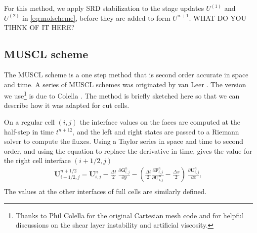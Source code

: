For this method, we apply SRD stabilization to the stage updates
$U^{(1)}$ and $U^{(2)}$ in \eqref{eq:molscheme}, before they are added to form $U^{n+1}$.
WHAT DO YOU TIHNK OF IT HERE?

\subsection{MUSCL scheme} \label{sec:muscl}
The MUSCL scheme is a one step method that is second order accurate in
space and time. A series of MUSCL schemes  was originated by van Leer 
\cite{vanleer:muscl}. The version we use\footnote{Thanks to Phil 
Colella for the original Cartesian mesh code and for helpful discussions on the shear
layer instability and artificial viscosity.}
is due to Colella \cite{Colella:Unsplit}.
The method is briefly sketched here so that we can describe how it was
adapted for cut cells. 

On a regular cell $(i,j)$ the interface values on the 
faces are computed at the half-step in time $t^{n+12}$, and the left and right states
are passed to a Riemann
solver to compute the fluxes.
Using a Taylor series in space and time to second order,
and using the equation to replace the derivative in time, gives the value for the right cell
interface $(i+1/2,j)$ 
\begin{equation}\label{eqn:taylor}
\begin{split}
\mathbf{U}_{i+1/2,j}^{n+1/2}   = \mathbf{U}_{i,j}^n - \frac{\Delta t}{2} \, 
             \frac{\partial \mathbf{G}_{i,j}^n}{\partial y}  -
            \left( \frac{\Delta t}{2} 
            \frac{\partial \mathbf{F}_{i,j}^n}{\partial \mathbf{U}^n_{i,j}} -
             \frac{\Delta x}{2} \right) \,\frac{\partial \mathbf{U}_{i,j}^n}{\partial x}, \\[.08in]
\end{split}
\end{equation}
The values at the other interfaces of full cells are similarly defined.


